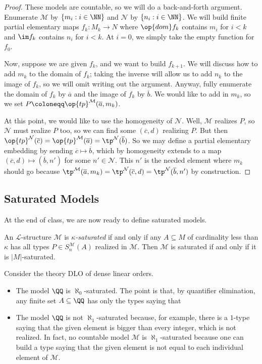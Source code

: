 \documentclass[../notes.tex]{subfiles}
\begin{document}
\begin{proof}
	These models are countable, so we will do a back-and-forth argument. Enumerate $\mathcal M$ by $\{m_i:i\in\NN\}$ and $\mathcal N$ by $\{n_i:i\in\NN\}$. We will build finite partial elementary maps $f_k\colon M_k\to N$ where $\op{dom}f_k$ contains $m_i$ for $i<k$ and $\im f_k$ contains $n_i$ for $i<k$. At $i=0$, we simply take the empty function for $f_0$.

	Now, suppose we are given $f_k$, and we want to build $f_{k+1}$. We will discuss how to add $m_k$ to the domain of $f_k$; taking the inverse will allow us to add $n_k$ to the image of $f_k$, so we will omit writing out the argument. Anyway, fully enumerate the domain of $f_k$ by $\overline a$ and the image of $f_k$ by $\overline b$. We would like to add in $m_k$, so we set $P\coloneqq\op{tp}^\mathcal M(\overline a,m_k)$.

	At this point, we would like to use the homogeneity of $\mathcal N$. Well, $\mathcal M$ realizes $P$, so $\mathcal N$ must realize $P$ too, so we can find some $(\overline c,d)$ realizing $P$. But then $\op{tp}^\mathcal N(\overline c)=\op{tp}^\mathcal M(\overline a)=\tp^\mathcal N(\overline b)$. So we may define a partial elementary embedding by sending $\overline c\mapsto\overline b$, which by homogeneity extends to a map $(\overline c,d)\mapsto(\overline b,n')$ for some $n'\in\mathcal N$. This $n'$ is the needed element where $m_k$ should go because $\tp^\mathcal M(\overline a,m_k)=\tp^\mathcal N(\overline c,d)=\tp^\mathcal N(\overline b,n')$ by construction.
\end{proof}

\subsection{Saturated Models}
At the end of class, we are now ready to define saturated models.
\begin{defihelper} 
	An $\mathcal L$-structure $\mathcal M$ is \textit{$\kappa$-saturated} if and only if any $A\subseteq M$ of cardinality less than $\kappa$ has all types $P\in S_n^\mathcal M(A)$ realized in $\mathcal M$. Then $\mathcal M$ is saturated if and only if it is $\left|M\right|$-saturated.
\end{defihelper}
\begin{example}
	Consider the theory $\mathrm{DLO}$ of dense linear orders.
	\begin{itemize}
		\item The model $\QQ$ is $\aleph_0$-saturated. The point is that, by quantifier elimination, any finite set $A\subseteq\QQ$ has only the types saying that
		\item The model $\QQ$ is not $\aleph_1$-saturated because, for example, there is a $1$-type saying that the given element is bigger than every integer, which is not realized. In fact, no countable model $\mathcal M$ is $\aleph_1$-saturated because one can build a type saying that the given element is not equal to each individual element of $\mathcal M$.
	\end{itemize}
\end{example}
\end{document}
